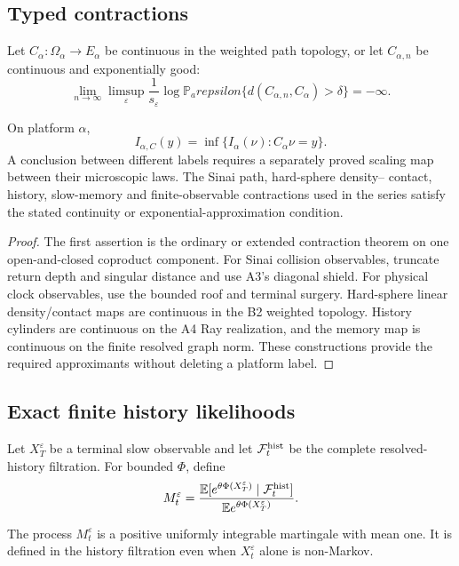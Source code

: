 \subsection{Typed contractions}

Let \(C_\alpha:\Omega_\alpha\to E_\alpha\) be continuous in the weighted
path topology, or let \(C_{\alpha,n}\) be continuous and exponentially good:
\[
 \lim_{n\to\infty}\limsup_\varepsilon
 \frac1{s_\varepsilon}
 \log\mathbb P_arepsilon
 \{d(C_{\alpha,n},C_\alpha)>\delta\}=-\infty.
\]

\begin{theorem}
\label{thm:r5-c2-contraction}
On platform \(\alpha\),
\[
 I_{\alpha,C}(y)=
 \inf\{I_\alpha(\nu):C_\alpha\nu=y\}.
\]
A conclusion between different labels requires a separately proved scaling
map between their microscopic laws.  The Sinai path, hard-sphere density--
contact, history, slow-memory and finite-observable contractions used in the
series satisfy the stated continuity or exponential-approximation condition.
\end{theorem}

\begin{proof}
The first assertion is the ordinary or extended contraction theorem on one
open-and-closed coproduct component.  For Sinai collision observables, truncate
return depth and singular distance and use A3's diagonal shield.  For physical
clock observables, use the bounded roof and terminal surgery.  Hard-sphere
linear density/contact maps are continuous in the B2 weighted topology.
History cylinders are continuous on the A4 Ray realization, and the memory
map is continuous on the finite resolved graph norm.  These constructions
provide the required approximants without deleting a platform label.
\end{proof}

\subsection{Exact finite history likelihoods}

Let \(X_T^\varepsilon\) be a terminal slow observable and let
\(\mathcal F_t^{\rm hist}\) be the complete resolved-history filtration.
For bounded \(\Phi\), define
\[
 M_t^\varepsilon=
 \frac{\mathbb E[
 e^{\theta\Phi(X_T^\varepsilon)}
 \mid\mathcal F_t^{\rm hist}]}
 {\mathbb E e^{\theta\Phi(X_T^\varepsilon)}}.
\]

\begin{lemma}
\label{lem:r5-c2-martingale}
The process \(M_t^\varepsilon\) is a positive uniformly integrable martingale
with mean one.  It is defined in the history filtration even when
\(X_t^\varepsilon\) alone is non-Markov.
\end{lemma}

